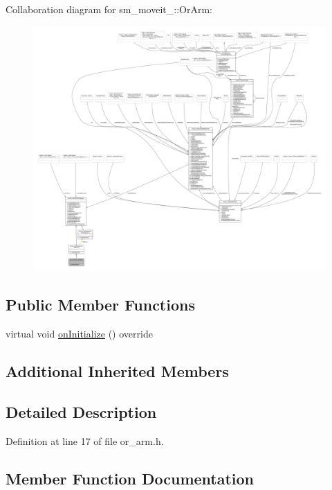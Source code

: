 Collaboration diagram for sm\+\_\+moveit\+\_\+:\+:Or\+Arm\+:
\nopagebreak
\begin{figure}[H]
\begin{center}
\leavevmode
\includegraphics[width=350pt]{classsm__moveit__4_1_1OrArm__coll__graph}
\end{center}
\end{figure}
\subsection*{Public Member Functions}
\begin{DoxyCompactItemize}
\item 
virtual void \hyperlink{classsm__moveit__4_1_1OrArm_a9269c0a4712d81a1ee18640c66fef0ff}{on\+Initialize} () override
\end{DoxyCompactItemize}
\subsection*{Additional Inherited Members}


\subsection{Detailed Description}


Definition at line 17 of file or\+\_\+arm.\+h.



\subsection{Member Function Documentation}
\mbox{\label{classsm__moveit__4_1_1OrArm_a9269c0a4712d81a1ee18640c66fef0ff}} 
